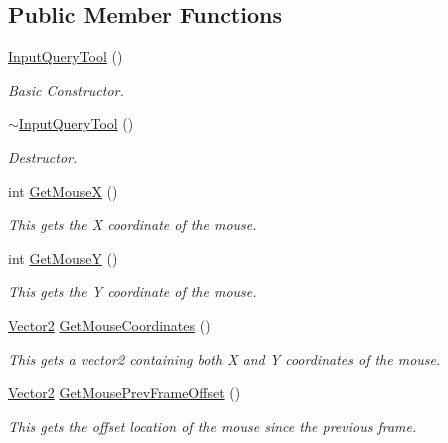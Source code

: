 \subsection*{Public Member Functions}
\begin{DoxyCompactItemize}
\item 
\hyperlink{classphys_1_1InputQueryTool_a10a997ec2e072d31808c794542c0516f}{InputQueryTool} ()
\begin{DoxyCompactList}\small\item\em Basic Constructor. \item\end{DoxyCompactList}\item 
\hyperlink{classphys_1_1InputQueryTool_a6a37616800928b691932045ba34759b8}{$\sim$InputQueryTool} ()
\begin{DoxyCompactList}\small\item\em Destructor. \item\end{DoxyCompactList}\item 
int \hyperlink{classphys_1_1InputQueryTool_a1df560487b85fcb90fd9294f3009eee6}{GetMouseX} ()
\begin{DoxyCompactList}\small\item\em This gets the X coordinate of the mouse. \item\end{DoxyCompactList}\item 
int \hyperlink{classphys_1_1InputQueryTool_a5cab535728ba864a83e7c374cc683d0b}{GetMouseY} ()
\begin{DoxyCompactList}\small\item\em This gets the Y coordinate of the mouse. \item\end{DoxyCompactList}\item 
\hyperlink{classphys_1_1Vector2}{Vector2} \hyperlink{classphys_1_1InputQueryTool_affd9523f67b542b208e6d36c3395e72b}{GetMouseCoordinates} ()
\begin{DoxyCompactList}\small\item\em This gets a vector2 containing both X and Y coordinates of the mouse. \item\end{DoxyCompactList}\item 
\hyperlink{classphys_1_1Vector2}{Vector2} \hyperlink{classphys_1_1InputQueryTool_aea2da0aeb97353f9d7af75f2a8cb7d91}{GetMousePrevFrameOffset} ()
\begin{DoxyCompactList}\small\item\em This gets the offset location of the mouse since the previous frame. \item\end{DoxyCompactList}\item 

\end{DoxyCompactItemize}
